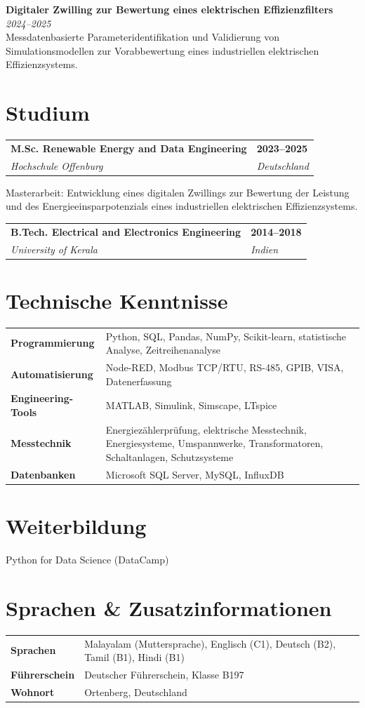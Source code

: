 \documentclass[10pt,a4paper]{article}
\makeatletter
\newcommand{\entry}[4]{\begin{tabularx}{\textwidth}{@{}X>{\raggedleft\arraybackslash}p{3.1cm}@{}}\textbf{#1} & \textbf{#2}\\\textit{#3} & \textit{#4}\end{tabularx}\vspace{1pt}}
\makeatother
\begin{document}
\textbf{Digitaler Zwilling zur Bewertung eines elektrischen Effizienzfilters} \hfill \textit{2024--2025}\\[-2pt]
Messdatenbasierte Parameteridentifikation und Validierung von Simulationsmodellen zur Vorabbewertung eines industriellen elektrischen Effizienzsystems.

\section{Studium}
\entry{M.Sc. Renewable Energy and Data Engineering}{2023--2025}{Hochschule Offenburg}{Deutschland}
Masterarbeit: Entwicklung eines digitalen Zwillings zur Bewertung der Leistung und des Energieeinsparpotenzials eines industriellen elektrischen Effizienzsystems.\\[3pt]
\entry{B.Tech. Electrical and Electronics Engineering}{2014--2018}{University of Kerala}{Indien}

\section{Technische Kenntnisse}
\begin{tabularx}{\textwidth}{@{}>{\bfseries}p{3.55cm}X@{}}
Programmierung & Python, SQL, Pandas, NumPy, Scikit-learn, statistische Analyse, Zeitreihenanalyse\\
Automatisierung & Node-RED, Modbus TCP/RTU, RS-485, GPIB, VISA, Datenerfassung\\
Engineering-Tools & MATLAB, Simulink, Simscape, LTspice\\
Messtechnik & Energiezählerprüfung, elektrische Messtechnik, Energiesysteme, Umspannwerke, Transformatoren, Schaltanlagen, Schutzsysteme\\
Datenbanken & Microsoft SQL Server, MySQL, InfluxDB\\
\end{tabularx}

\section{Weiterbildung}
Python for Data Science (DataCamp)

\section{Sprachen \& Zusatzinformationen}
\begin{tabularx}{\textwidth}{@{}>{\bfseries}p{3.55cm}X@{}}
Sprachen & Malayalam (Muttersprache), Englisch (C1), Deutsch (B2), Tamil (B1), Hindi (B1)\\
Führerschein & Deutscher Führerschein, Klasse B197\\
Wohnort & Ortenberg, Deutschland\\
\end{tabularx}
\end{document}
